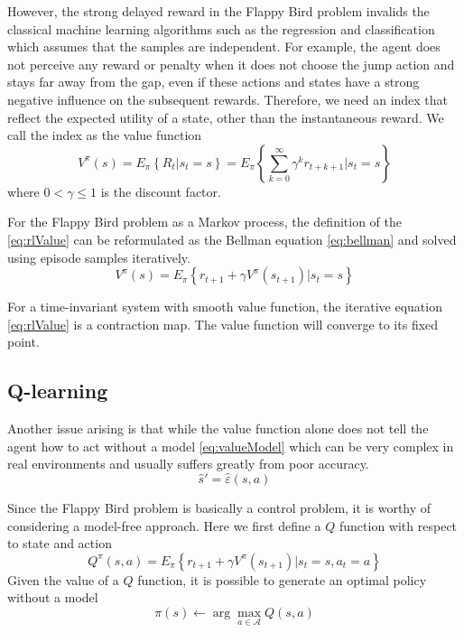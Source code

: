 \documentclass[conference,compsoc]{IEEEtran}
\begin{document}
However, the strong delayed reward in the Flappy Bird problem invalids the classical machine learning algorithms such as the regression and classification which assumes that the samples are independent. For example, the agent does not perceive any reward or penalty when it does not choose the jump action and stays far away from the gap, even if these actions and states have a strong negative influence on the subsequent rewards. Therefore, we need an index that reflect the expected utility of a state, other than the instantaneous reward. We call the index as the value function 
\begin{equation}\label{eq:rlValue}
V^{\pi}(s)
= E_{\pi} \left\{ R_t | s_t =s \right\}
= E_{\pi} \left\{ \sum_{k=0}^{\infty} \gamma^k r_{t+k+1} | s_t =s \right\}
\end{equation}
where $0<\gamma\leq 1$ is the discount factor. 
 
For the Flappy Bird problem as a Markov process, the definition of the \eqref{eq:rlValue} can be reformulated as the Bellman equation \eqref{eq:bellman} and solved using episode samples iteratively. 
\begin{equation}\label{eq:bellman}
V^{\pi}(s)
= E_{\pi} \left\{ r_{t+1}+\gamma V^{\pi}(s_{t+1}) | s_t =s \right\}
\end{equation}

For a time-invariant system with smooth value function, the iterative equation \eqref{eq:rlValue} is a contraction map. The value function will converge to its fixed point. 

\subsection{Q-learning}
Another issue arising is that while the value function alone does not tell the agent how to act without a model \eqref{eq:valueModel} which can be very complex in real environments and usually suffers greatly from poor accuracy. ~\cite{strehl2006pac}
\begin{equation}\label{eq:valueModel}
\hat{s}' = \hat{\varepsilon} (s,a)
\end{equation}

Since the Flappy Bird problem is basically a control problem, it is worthy of considering a model-free approach. Here we first define a $Q$ function with respect to state and action 
\begin{equation}
Q^{\pi} (s,a) = E_{\pi} \left\{ r_{t+1} +\gamma V^{\pi}(s_{t+1}) | s_t =s, a_t=a\right\}
\end{equation}
Given the value of a $Q$ function, it is possible to generate an optimal policy without a model
\begin{equation}
\pi(s) \leftarrow \arg \max_{a\in \mathcal{A}} Q(s,a)
\end{equation}
\end{document}
